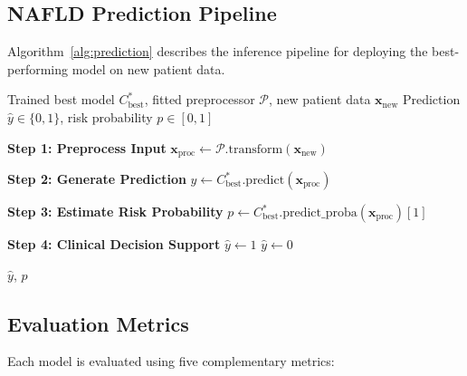 \documentclass[conference,10pt]{IEEEtran}
\begin{document}
\subsection{NAFLD Prediction Pipeline}
\label{subsec:prediction}

Algorithm~\ref{alg:prediction} describes the inference pipeline for deploying the best-performing model on new patient data.

\begin{algorithm}[!t]
\caption{NAFLD Prediction Pipeline}
\label{alg:prediction}
\small
\begin{algorithmic}[1]
\REQUIRE Trained best model $C^*_{\text{best}}$, fitted preprocessor $\mathcal{P}$, new patient data $\mathbf{x}_{\text{new}}$
\ENSURE Prediction $\hat{y} \in \{0, 1\}$, risk probability $p \in [0, 1]$

\STATE \textbf{Step 1: Preprocess Input}
\STATE $\mathbf{x}_{\text{proc}} \leftarrow \mathcal{P}.\text{transform}(\mathbf{x}_{\text{new}})$

\STATE \textbf{Step 2: Generate Prediction}
\STATE $\hat{y} \leftarrow C^*_{\text{best}}.\text{predict}(\mathbf{x}_{\text{proc}})$

\STATE \textbf{Step 3: Estimate Risk Probability}
\STATE $p \leftarrow C^*_{\text{best}}.\text{predict\_proba}(\mathbf{x}_{\text{proc}})[1]$

\STATE \textbf{Step 4: Clinical Decision Support}
    \STATE $\hat{y} \leftarrow 1$ 
\ELSE
    \STATE $\hat{y} \leftarrow 0$ 
\ENDIF

\RETURN $\hat{y}$, $p$
\end{algorithmic}
\end{algorithm}

\subsection{Evaluation Metrics}
\label{subsec:metrics}

Each model is evaluated using five complementary metrics:
\end{document}
